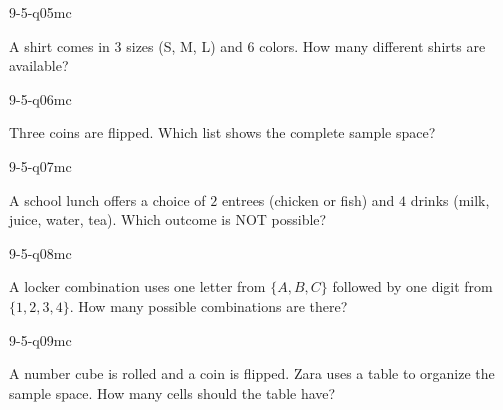 \begin{practiceQuestion}{9-5-q05}{mc}
\begin{questionText}
A shirt comes in $3$ sizes (S, M, L) and $6$ colors. How many different shirts are available?
\end{questionText}
\end{practiceQuestion}

\begin{practiceQuestion}{9-5-q06}{mc}
\begin{questionText}
Three coins are flipped. Which list shows the complete sample space?
\end{questionText}
\end{practiceQuestion}

\begin{practiceQuestion}{9-5-q07}{mc}
\begin{questionText}
A school lunch offers a choice of $2$ entrees (chicken or fish) and $4$ drinks (milk, juice, water, tea). Which outcome is NOT possible?
\end{questionText}
\end{practiceQuestion}

\begin{practiceQuestion}{9-5-q08}{mc}
\begin{questionText}
A locker combination uses one letter from $\{A, B, C\}$ followed by one digit from $\{1, 2, 3, 4\}$. How many possible combinations are there?
\end{questionText}
\end{practiceQuestion}

\begin{practiceQuestion}{9-5-q09}{mc}
\begin{questionText}
A number cube is rolled and a coin is flipped. Zara uses a table to organize the sample space. How many cells should the table have?
\end{questionText}
\end{practiceQuestion}

